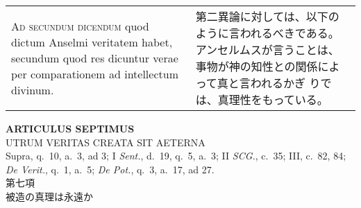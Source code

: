 \documentclass[10pt]{jsarticle} %
\begin{document}
\begin{longtable}{p{21em}p{21em}}
\\


{\scshape Ad secundum dicendum} quod dictum
Anselmi veritatem habet, secundum quod res dicuntur verae per
comparationem ad intellectum divinum.


&

第二異論に対しては、以下のように言われるべきである。
アンセルムスが言うことは、事物が神の知性との関係によって真と言われるかぎ
 りでは、真理性をもっている。

\\


\end{longtable}
\newpage

\begin{center}
 {\Large {\bf ARTICULUS SEPTIMUS}}\\
 {\large UTRUM VERITAS CREATA SIT AETERNA}\\
 {\footnotesize Supra, q.~10, a.~3, ad 3; I {\itshape Sent.}, d.~19,
 q.~5, a.~3; II {\itshape SCG.}, c.~35; III, c.~82, 84; {\itshape De
 Verit.}, q.~1, a.~5; {\itshape De Pot.}, q.~3, a.~17, ad 27.}\\
 {\Large 第七項\\被造の真理は永遠か}
\end{center}
\end{document}
